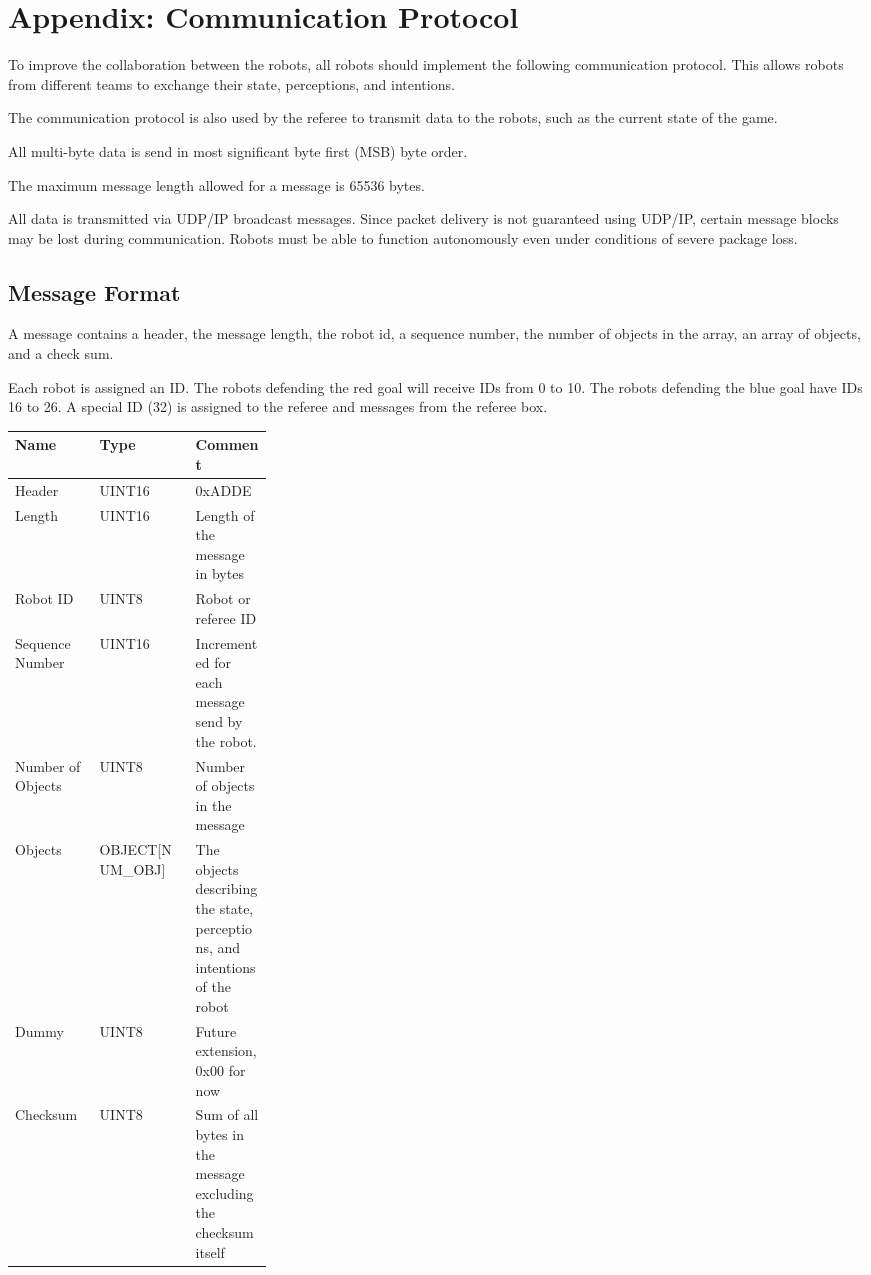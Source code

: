 \documentclass[12pt]{hurocup}
\begin{document}
\section*{Appendix: Communication Protocol}

To improve the collaboration between the robots, all robots should
implement the following communication protocol. This allows robots
from different teams to exchange their state, perceptions, and
intentions.

The communication protocol is also used by the referee to transmit
data to the robots, such as the current state of the game.

All multi-byte data is send in most significant byte first (MSB) byte
order. 

The maximum message length allowed for a message is 65536 bytes.

All data is transmitted via UDP/IP broadcast messages. Since packet
delivery is not guaranteed using UDP/IP, certain message blocks may be
lost during communication. Robots must be able to function
autonomously even under conditions of severe package loss.

\subsection*{Message Format}

A message contains a header, the message length, the robot id, a
sequence number, the number of objects in the array, an array of
objects, and a check sum.

Each robot is assigned an ID. The robots defending the red goal will
receive IDs from 0 to 10. The robots defending the blue goal have IDs
16 to 26. A special ID (32) is assigned to the referee and messages
from the referee box.


\begin{center}
\begin{tabular}[t]{|l|l|p{0.3\linewidth}|}
  \hline
  Name & Type & Comment \\
  \hline
  Header          & UINT16 & 0xADDE\\
  Length          & UINT16 & Length of the message in bytes\\
  Robot ID        & UINT8 & Robot or referee ID\\
  Sequence Number & UINT16 & Incremented for each message send by the
                             robot.\\
  Number of Objects & UINT8 & Number of objects in the message\\
  Objects & OBJECT[NUM\_OBJ] & The objects describing the state, perceptions,
                     and intentions of the robot\\
  Dummy & UINT8 & Future extension, 0x00 for now\\
  Checksum & UINT8 & Sum of all bytes in the message excluding the
                     checksum itself\\
  \hline
\end{tabular}
\end{center}
\end{document}
